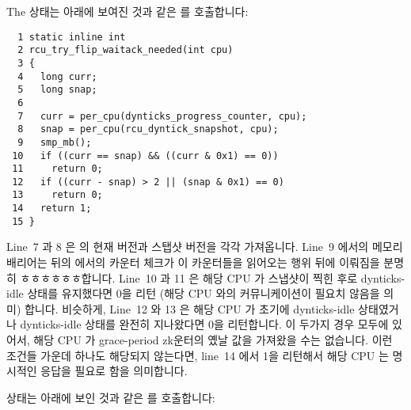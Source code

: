 The  상태는 아래에 보여진 것과 같은
 를 호출합니다:
\iffalse

The \co{rcu_try_flip_waitack_state()} state invokes
\co{rcu_try_flip_waitack_needed()}, shown below:
\fi

{ \scriptsize
\begin{verbatim}
  1 static inline int
  2 rcu_try_flip_waitack_needed(int cpu)
  3 {
  4   long curr;
  5   long snap;
  6
  7   curr = per_cpu(dynticks_progress_counter, cpu);
  8   snap = per_cpu(rcu_dyntick_snapshot, cpu);
  9   smp_mb();
 10   if ((curr == snap) && ((curr & 0x1) == 0))
 11     return 0;
 12   if ((curr - snap) > 2 || (snap & 0x1) == 0)
 13     return 0;
 14   return 1;
 15 }
\end{verbatim}
}

Line~7 과 8 은  의 현재 버전과 스탭샷 버전을 각각
가져옵니다.
Line~9 에서의 메모리 배리어는 뒤의  에서의
카운터 체크가 이 카운터들을 읽어오는 행위 뒤에 이뤄짐을 분명히
ㅎㅎㅎㅎㅎㅎ합니다.
Line~10 과 11 은 해당 CPU 가 스냅샷이 찍힌 후로 dynticks-idle 상태를 유지했다면
0을 리턴 (해당 CPU 와의 커뮤니케이션이 필요치 않음을 의미) 합니다.
비슷하게, Line~12 와 13 은 해당 CPU 가 초기에 dynticks-idle 상태였거나
dynticks-idle 상태를 완전히 지나왔다면 0을 리턴합니다.
이 두가지 경우 모두에 있어서, 해당 CPU 가 grace-period zk운터의 옜날 값을
가져왔을 수는 없습니다.
이런 조건들 가운데 하나도 해당되지 않는다면, line~14 에서 1을 리턴해서 해당 CPU
는 명시적인 응답을 필요로 함을 의미합니다.
\iffalse

Lines~7 and~8 pick up current and snapshot versions of
\co{dynticks_progress_counter}, respectively.
The memory barrier on line~9 ensures that the counter checks
in the later \co{rcu_try_flip_waitzero_state()} follow
the fetches of these counters.
Lines~10 and~11 return zero (meaning no communication with the
specified CPU is required) if that CPU has remained in dynticks-idle
state since the time that the snapshot was taken.
Similarly, lines~12 and~13 return zero if that CPU was initially
in dynticks-idle state or if it has completely passed through a
dynticks-idle state.
In both these cases, there is no way that that CPU could have retained
the old value of the grace-period counter.
If neither of these conditions hold, line~14 returns one, meaning
that the CPU needs to explicitly respond.
\fi

 상태는 아래에 보인 것과 같은
 를 호출합니다:
\iffalse


